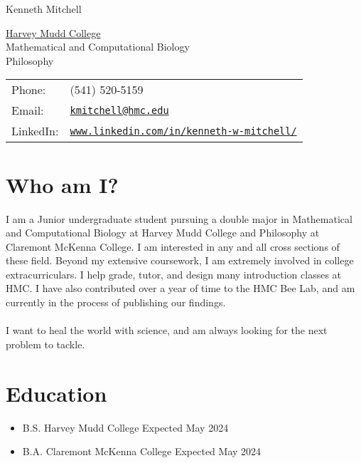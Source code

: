 \documentclass[letterpaper]{article}
\def\name{Kenneth Mitchell}
\begin{document}
{\huge \name}


\vspace{0.25in}

\begin{minipage}{0.45\linewidth}
  \href{http://www.hmc.edu/}{Harvey Mudd College} \\
  Mathematical and Computational Biology \\
  Philosophy
\end{minipage}
\begin{minipage}{0.45\linewidth}
  \begin{tabular}{ll}
    Phone: & (541) 520-5159 \\
    Email: & \href{mailto:kmitchell@hmc.edu}{\tt kmitchell@hmc.edu} \\
    LinkedIn: & \href{www.linkedin.com/in/kenneth-w-mitchell/}{\tt www.linkedin.com/in/kenneth-w-mitchell/} \\
  \end{tabular}
\end{minipage}


\section*{Who am I?}
I am a Junior undergraduate student pursuing a double major in Mathematical and Computational Biology at Harvey Mudd College and Philosophy at Claremont McKenna College. 
I am interested in any and all cross sections of these field. Beyond my extensive coursework, I am extremely involved in college extracurriculars. I help grade, tutor, and design many introduction classes at HMC. I have also contributed over a year of time to the HMC Bee Lab, and am currently in the process of publishing our findings.\\
\\
I want to heal the world with science, and am always looking for the next problem to tackle.



\section*{Education}

\begin{itemize}
  \item B.S. Harvey Mudd College \hfill Expected May 2024

  \item B.A. Claremont McKenna College \hfill Expected May 2024
\end{itemize}
\end{document}
